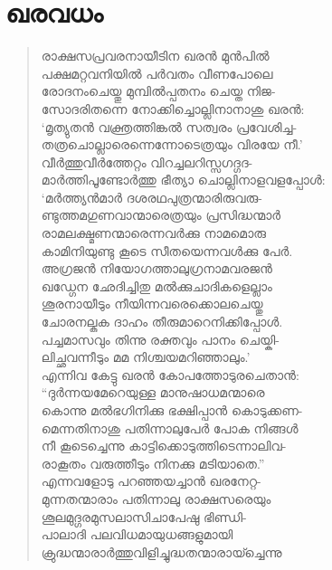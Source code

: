 \section{ഖരവധം}

\begin{verse}
രാക്ഷസപ്രവരനായീടിന ഖരന്‍ മുന്‍പില്‍\\
പക്ഷമറ്റവനിയില്‍ പര്‍വതം വീണപോലെ\\
രോദനംചെയ്തു മുമ്പില്‍പ്പതനം ചെയ്ത നിജ-\\
സോദരിതന്നെ നോക്കിച്ചൊല്ലിനാനാശു ഖരന്‍:\\
‘മൃത്യുതന്‍ വക്ത്രത്തിങ്കല്‍ സത്വരം പ്രവേശിച്ച-\\
തത്രചൊല്ലാരെന്നെന്നോടെത്രയും വിരയേ നീ.’\\
വീര്‍ത്തുവീര്‍ത്തേറ്റം വിറച്ചലറിസ്സഗദ്ഗദ-\\
മാര്‍ത്തിപൂണ്ടോര്‍ത്തു ഭീത്യാ ചൊല്ലിനാളവളപ്പോള്‍:\\
‘മര്‍ത്ത്യന്‍മാര്‍ ദശരഥപുത്രന്മാരിരുവരു-\\
ണ്ടുത്തമഗുണവാന്മാരെത്രയും പ്രസിദ്ധന്മാര്‍\\
രാമലക്ഷ്മണന്മാരെന്നവര്‍ക്കു നാമമൊരു\\
കാമിനിയുണ്ടു കൂടെ സീതയെന്നവള്‍ക്കു പേര്‍.\\
അഗ്രജന്‍ നിയോഗത്താലുഗ്രനാമവരജന്‍\\
ഖഡ്ഗേന ഛേദിച്ചിതു മല്‍ക്കുചാദികളെല്ലാം\\
ശൂരനായീടും നീയിന്നവരെക്കൊലചെയ്തു\\
ചോരനല്കുക ദാഹം തീരുമാറെനിക്കിപ്പോള്‍.\\
പച്ചമാസവും തിന്നു രക്തവും പാനം ചെയ്കി-\\
ലിച്ഛവന്നീടും മമ നിശ്ചയമറിഞ്ഞാലും.’\\
എന്നിവ കേട്ടു ഖരന്‍ കോപത്തോടുരചെതാന്‍:\\
“ദുര്‍ന്നയമേറെയുള്ള മാനുഷാധമന്മാരെ\\
കൊന്നു മല്‍ഭഗിനിക്കു ഭക്ഷിപ്പാന്‍ കൊടുക്കണ-\\
മെന്നതിനാശു പതിന്നാലുപേര്‍ പോക നിങ്ങള്‍\\
നീ കൂടെച്ചെന്നു കാട്ടിക്കൊടുത്തിടെന്നാലിവ-\\
രാകൂതം വരുത്തീടും നിനക്കു മടിയാതെ.”\\
എന്നവളോടു പറഞ്ഞയച്ചാന്‍ ഖരനേറ്റ-\\
മുന്നതന്മാരാം പതിന്നാലു രാക്ഷസരെയും\\
ശൂലമുദ്ഗരമുസലാസിചാപേഷു ഭിണ്ഡി-\\
പാലാദി പലവിധമായുധങ്ങളുമായി\\
ക്രുദ്ധന്മാരാര്‍ത്തുവിളിച്ചുദ്ധതന്മാരായ്ച്ചെന്നു\\

\end{verse}
